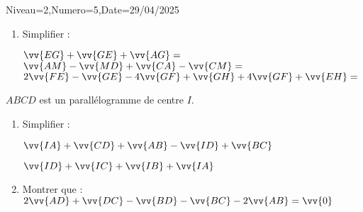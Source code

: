 \documentclass[a4paper,12pt]{article}
\begin{document}
\begin{Maquette}[DS]{Niveau=2,Numero=5,Date=29/04/2025}
\begin{exercice}[BaremeDetaille=true]
\begin{enumerate}
\item Simplifier :

\(\vv{EG}+\vv{GE}+\vv{AG}= \)\anserline[2]
\(\vv{AM}-\vv{MD}+\vv{CA}-\vv{CM}= \)\anserline[2]
\(2\vv{FE}-\vv{GE}-4\vv{GF}+\vv{GH}+4\vv{GF}+\vv{EH}= \)\anserline[5]
\end{enumerate}
\end{exercice}

\begin{exercice}[BaremeDetaille=true]
$ABCD$ est un parallélogramme de centre $I$.
\begin{enumerate}
\item{} Simplifier :
\begin{multicols}{2}
$\vv{IA}+\vv{CD}+\vv{AB}-\vv{ID}+\vv{BC}$

\anserline[5]
\columnbreak

$\vv{ID}+\vv{IC}+\vv{IB}+\vv{IA}$

\anserline[5]
\end{multicols}
\item{} Montrer que : $2\vv{AD}+\vv{DC}-\vv{BD}-\vv{BC}-2\vv{AB}=\vv{0}$

\anserline[9]
\end{enumerate}
\end{exercice}
\end{Maquette}
\end{document}
